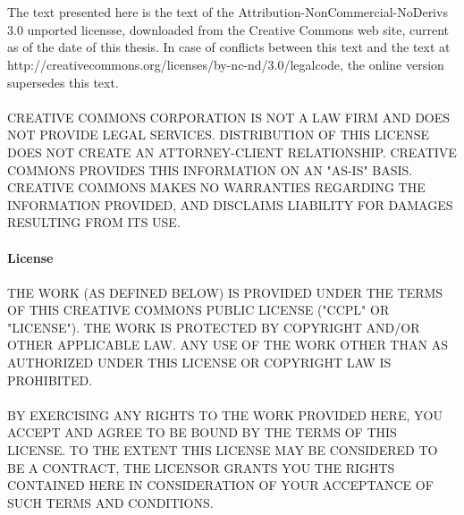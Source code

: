\clearpage
\thispagestyle{empty}
\setcounter{secnumdepth}{0}
\label{sec:appendixL}
\\ \\

The text presented here is the text of the Attribution-NonCommercial-NoDerivs
3.0 unported licensse, downloaded from the Creative Commons web site, current as
of the date of this thesis. In case of conflicts between this text and the text
at http://creativecommons.org/licenses/by-nc-nd/3.0/legalcode, the online
version supersedes this text. \\ \\

CREATIVE COMMONS CORPORATION IS NOT A LAW FIRM AND DOES NOT PROVIDE LEGAL
SERVICES. DISTRIBUTION OF THIS LICENSE DOES NOT CREATE AN ATTORNEY-CLIENT
RELATIONSHIP. CREATIVE COMMONS PROVIDES THIS INFORMATION ON AN "AS-IS" BASIS.
CREATIVE COMMONS MAKES NO WARRANTIES REGARDING THE INFORMATION PROVIDED, AND
DISCLAIMS LIABILITY FOR DAMAGES RESULTING FROM ITS USE. \\ \\

\textbf{License} \\ \\

THE WORK (AS DEFINED BELOW) IS PROVIDED UNDER THE TERMS OF THIS CREATIVE COMMONS
PUBLIC LICENSE ("CCPL" OR "LICENSE"). THE WORK IS PROTECTED BY COPYRIGHT AND/OR
OTHER APPLICABLE LAW. ANY USE OF THE WORK OTHER THAN AS AUTHORIZED UNDER THIS
LICENSE OR COPYRIGHT LAW IS PROHIBITED.\\ \\

BY EXERCISING ANY RIGHTS TO THE WORK PROVIDED HERE, YOU ACCEPT AND AGREE TO BE
BOUND BY THE TERMS OF THIS LICENSE. TO THE EXTENT THIS LICENSE MAY BE CONSIDERED
TO BE A CONTRACT, THE LICENSOR GRANTS YOU THE RIGHTS CONTAINED HERE IN
CONSIDERATION OF YOUR ACCEPTANCE OF SUCH TERMS AND CONDITIONS.\\ \\

